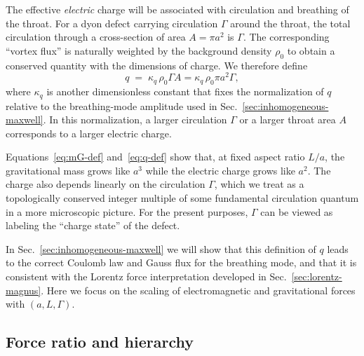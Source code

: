 \documentclass[11pt]{article}
\begin{document}
The effective \emph{electric} charge will be associated with circulation and breathing of the throat.  For a dyon defect carrying circulation $\Gamma$ around the throat, the total circulation through a cross-section of area $A = \pi a^2$ is $\Gamma$.  The corresponding ``vortex flux'' is naturally weighted by the background density $\rho_0$ to obtain a conserved quantity with the dimensions of charge.  We therefore define
\begin{equation}
q \;=\; \kappa_q\,\rho_0 \Gamma A
= \kappa_q\,\rho_0 \pi a^2 \Gamma,
\label{eq:q-def}
\end{equation}
where $\kappa_q$ is another dimensionless constant that fixes the normalization of $q$ relative to the breathing-mode amplitude used in Sec.~\ref{sec:inhomogeneous-maxwell}.  In this normalization, a larger circulation $\Gamma$ or a larger throat area $A$ corresponds to a larger electric charge.

Equations~\eqref{eq:mG-def} and~\eqref{eq:q-def} show that, at fixed aspect ratio $L/a$, the gravitational mass grows like $a^3$ while the electric charge grows like $a^2$.  The charge also depends linearly on the circulation $\Gamma$, which we treat as a topologically conserved integer multiple of some fundamental circulation quantum in a more microscopic picture.  For the present purposes, $\Gamma$ can be viewed as labeling the ``charge state'' of the defect.

In Sec.~\ref{sec:inhomogeneous-maxwell} we will show that this definition of $q$ leads to the correct Coulomb law and Gauss flux for the breathing mode, and that it is consistent with the Lorentz force interpretation developed in Sec.~\ref{sec:lorentz-magnus}.  Here we focus on the scaling of electromagnetic and gravitational forces with $(a,L,\Gamma)$.

\subsection{Force ratio and hierarchy}
\end{document}
